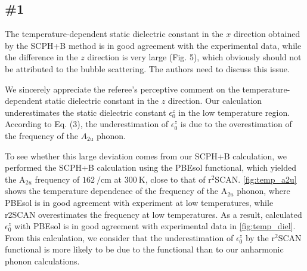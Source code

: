 \documentclass[luatex,onecolumn,showpacs,aps,preprint,prb,amsfonts,amsmath,amssymb,floatfix,groupedaddress, longbibliography]{revtex4-2}
\begin{document}
\subsection{\#1}

\RC The temperature-dependent static dielectric constant in the $x$ direction obtained by the SCPH+B method is in good agreement with the experimental data, while the difference in the $z$ direction is very large (Fig. 5), which obviously should not be attributed to the bubble scattering. The authors need to discuss this issue.

\AR We sincerely appreciate the referee's perceptive comment on the temperature-dependent static dielectric constant in the $z$ direction. Our calculation underestimates the static dielectric constant $\epsilon_0^z$ in the low temperature region. According to Eq. (3), the underestimation of $\epsilon_0^z$ is due to the overestimation of the frequency of the $A_{\mathrm{2u}}$ phonon. %


To see whether this large deviation comes from our SCPH+B calculation, we performed the SCPH+B calculation using the PBEsol functional, which yielded the $\mathrm{A}_{2u}$ frequency of $\SI{162}{\per\cm}$ at $\SI{300}{\kelvin}$, close to that of $\mathrm{r}^2$SCAN. \cref{fig:temp_a2u} shows the temperature dependence of the frequency of the $\mathrm{A}_{2u}$ phonon, where PBEsol is in good agreement with experiment at low temperatures, while r2SCAN overestimates the frequency at low temperatures. As a result, calculated $\epsilon_0^z$ with PBEsol is in good agreement with experimental data in \cref{fig:temp_diel}. From this calculation, we consider that the underestimation of $\epsilon_0^z$ by the $\mathrm{r}^2$SCAN functional is more likely to be due to the functional than to our anharmonic phonon calculations.


\end{document}
